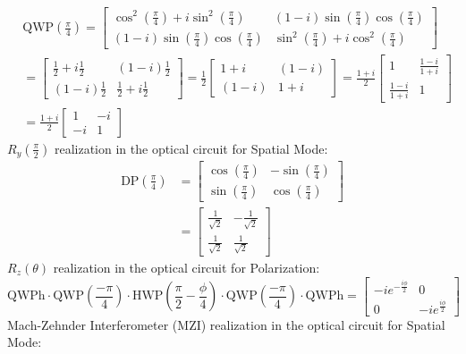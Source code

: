 \documentclass{article}
\begin{document}
\begin{align*}
	&\text{QWP}(\frac{\pi}{4})= 
	\begin{bmatrix}
		\cos^2 (\frac{\pi}{4}) + i \sin^2 (\frac{\pi}{4}) & (1-i) \sin(\frac{\pi}{4})\cos(\frac{\pi}{4})     \\
		(1-i) \sin(\frac{\pi}{4})\cos(\frac{\pi}{4})      & \sin^2 (\frac{\pi}{4}) + i \cos^2(\frac{\pi}{4})
	\end{bmatrix} \\[2ex]
	&= \begin{bmatrix}
		\frac{1}{2} + i \frac{1}{2} & (1-i) \frac{1}{2} \\
		(1-i) \frac{1}{2}          & \frac{1}{2} + i \frac{1}{2}
	\end{bmatrix} = 
	\frac{1}{2} 
	\begin{bmatrix}
		1+i & (1-i) \\
		(1-i) & 1+i
	\end{bmatrix} = \frac{1+i}{2}
	\begin{bmatrix}
		1 & \frac{1-i}{1+i}\\
		\frac{1-i}{1+i} & 1
	\end{bmatrix} \\[2ex]
	&= \frac{1+i}{2}
	\begin{bmatrix}
		1 & -i \\
		-i & 1
	\end{bmatrix}
\end{align*}
$R_y(\frac{\pi}{2})$ realization in the optical circuit for Spatial Mode:
\begin{align*}
	\text{DP}(\frac{\pi}{4}) &= \begin{bmatrix}
		\cos(\frac{\pi}{4}) & -\sin(\frac{\pi}{4}) \\
		\sin(\frac{\pi}{4}) & \cos(\frac{\pi}{4})
	\end{bmatrix} \\[2ex]
	&= \begin{bmatrix}
		\frac{1}{\sqrt{2}} & -\frac{1}{\sqrt{2}} \\
		\frac{1}{\sqrt{2}} & \frac{1}{\sqrt{2}}
	\end{bmatrix}
\end{align*}
$R_z(\theta)$ realization in the optical circuit for Polarization:
\[\text{QWPh} \cdot \text{QWP}(\frac{-\pi}{4}) \cdot \text{HWP}(\frac{\pi}{2} - \frac{\phi}{4}) \cdot \text{QWP}(\frac{-\pi}{4}) \cdot \text{QWPh} = \begin{bmatrix}
	-ie^{-\frac{i\phi}{2}} & 0 \\
	0 & -ie^{\frac{i\phi}{2}}
\end{bmatrix}\]
Mach-Zehnder Interferometer (MZI) realization in the optical circuit for Spatial Mode:
\end{document}
